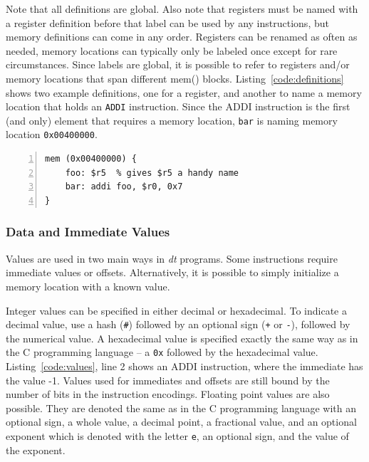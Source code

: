 Note that all definitions are global.  Also note that 
registers must be named with a register definition
before that label can be used by any instructions, 
but memory definitions can come in any order.
Registers can be renamed as often as needed, 
memory locations can typically only be labeled once
except for rare circumstances. Since labels are 
global, it is possible to refer to registers
and/or memory locations that span different mem() blocks.
Listing~\ref{code:definitions} shows two example 
definitions, one for a register, and another to 
name a memory location that holds an \texttt{ADDI} instruction.
Since the ADDI instruction is the first (and only)
element that requires a memory location, 
\texttt{bar} is naming memory location \texttt{0x00400000}.

\begin{lstlisting}[label=code:definitions,caption=Code example of a register and memory definition,basicstyle=\footnotesize,numbers=left,numberstyle=\tiny,stepnumber=1, numbersep=6pt,frame=single,captionpos=b,escapechar=@]
mem (0x00400000) {
    foo: $r5  % gives $r5 a handy name
    bar: addi foo, $r0, 0x7
}
\end{lstlisting}

\subsubsection{Data and Immediate Values\label{sec:values}}

Values are used in two main ways in \emph{dt} programs. Some
instructions require immediate values or offsets.  Alternatively, 
it is possible to simply initialize a memory location with 
a known value.

Integer values can be specified in either decimal or hexadecimal.
To indicate a decimal value, use a hash (\texttt{\#}) followed 
by an optional sign (\texttt{+} or \texttt{-}), followed by the
numerical value. A hexadecimal value is specified exactly the 
same way as in the C programming language -- a \texttt{0x} followed
by the hexadecimal value.  Listing~\ref{code:values}, line 2 shows an ADDI
instruction, where the immediate has the value -1. Values 
used for immediates and offsets are 
still bound by the number of bits in the instruction encodings.
Floating point values are also possible. They are denoted the same 
as in the C programming language with an optional sign, a whole value,
a decimal point, a fractional value, and an optional exponent which is
denoted with the letter \texttt{e}, an optional sign, and the value of 
the exponent.

